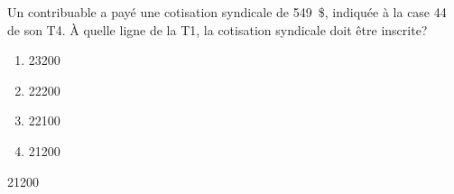 \begin{question}
	Un contribuable a payé une cotisation syndicale de 549~\$, indiquée à la case 44 de son T4. À quelle ligne de la T1, la cotisation syndicale doit être inscrite?
	\begin{enumerate}[label=\Alph*.]
		\item 23200
		\item 22200
		\item 22100
		\item 21200
	\end{enumerate}
\end{question}
21200
